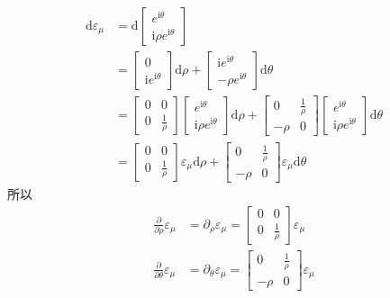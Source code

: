 \documentclass[UTF8]{ctexart}
\begin{document}
\begin{align*}
    \mathrm{d} \varepsilon_\mu &= \mathrm{d} \begin{bmatrix}
        e^{\mathrm{i}\theta}\\\mathrm{i}\rho  e^{\mathrm{i}\theta}
    \end{bmatrix} \\ 
    &=\begin{bmatrix}
        0\\\mathrm{i}  e^{\mathrm{i}\theta}
    \end{bmatrix} \mathrm{d} \rho+\begin{bmatrix}
        \mathrm{i} e^{\mathrm{i}\theta}\\-\rho  e^{\mathrm{i}\theta}
    \end{bmatrix}\mathrm{d}\theta\\
    &=\begin{bmatrix}0&0\\0&\frac{1}{\rho}\end{bmatrix}\begin{bmatrix}
        e^{\mathrm{i}\theta}\\\mathrm{i}\rho  e^{\mathrm{i}\theta}
    \end{bmatrix}\mathrm{d} \rho+\begin{bmatrix}0&\frac{1}{\rho}\\-\rho&0\end{bmatrix}\begin{bmatrix}
        e^{\mathrm{i}\theta}\\\mathrm{i}\rho  e^{\mathrm{i}\theta}
    \end{bmatrix}\mathrm{d}\theta\\
    &=\begin{bmatrix}0&0\\0&\frac{1}{\rho}\end{bmatrix}\varepsilon_\mu\mathrm{d} \rho+\begin{bmatrix}0&\frac{1}{\rho}\\-\rho&0\end{bmatrix}\varepsilon_\mu\mathrm{d}\theta
\end{align*}
所以
\begin{align*}
    \frac{\partial }{\partial \rho}\varepsilon_\mu&= \partial_\rho\varepsilon_\mu= \begin{bmatrix}0&0\\0&\frac{1}{\rho}\end{bmatrix}\varepsilon_\mu\\
    \frac{\partial }{\partial \theta}\varepsilon_\mu&=\partial_\theta\varepsilon_\mu=\begin{bmatrix}0&\frac{1}{\rho}\\-\rho&0\end{bmatrix}\varepsilon_\mu
\end{align*}
\end{document}
